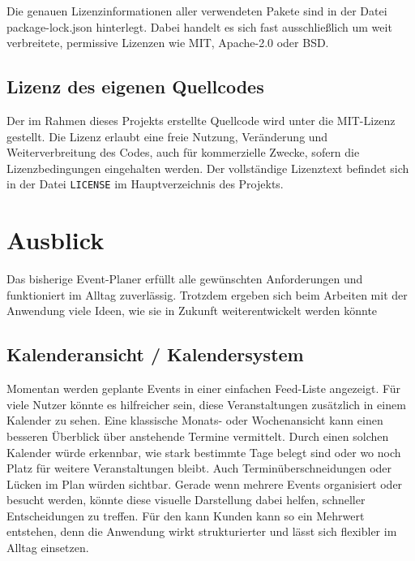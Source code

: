 \documentclass[a4paper,12pt]{article}
\begin{document}
Die genauen Lizenzinformationen aller verwendeten Pakete sind in der Datei package-lock.json hinterlegt. Dabei handelt es sich fast ausschließlich um weit verbreitete, permissive Lizenzen wie MIT, Apache-2.0 oder BSD.

\subsection{Lizenz des eigenen Quellcodes}

Der im Rahmen dieses Projekts erstellte Quellcode wird unter die MIT-Lizenz gestellt. Die Lizenz erlaubt eine freie Nutzung, Veränderung und Weiterverbreitung des Codes, auch für kommerzielle Zwecke, sofern die Lizenzbedingungen eingehalten werden. Der vollständige Lizenztext befindet sich in der Datei \texttt{LICENSE} im Hauptverzeichnis des Projekts.


\newpage


\section{Ausblick}

Das bisherige Event-Planer erfüllt alle gewünschten Anforderungen und funktioniert im Alltag zuverlässig. Trotzdem ergeben sich beim Arbeiten mit der Anwendung viele Ideen, wie sie in Zukunft weiterentwickelt werden könnte


\subsection{Kalenderansicht / Kalendersystem}

Momentan werden geplante Events in einer einfachen Feed-Liste angezeigt. Für viele Nutzer könnte es hilfreicher sein, diese Veranstaltungen zusätzlich in einem Kalender zu sehen. Eine klassische Monats- oder Wochenansicht kann einen besseren Überblick über anstehende Termine vermittelt. Durch einen solchen Kalender würde erkennbar, wie stark bestimmte Tage belegt sind oder wo noch Platz für weitere Veranstaltungen bleibt. Auch Terminüberschneidungen oder Lücken im Plan würden sichtbar. Gerade wenn mehrere Events organisiert oder besucht werden, könnte diese visuelle Darstellung dabei helfen, schneller Entscheidungen zu treffen. Für den kann Kunden kann so ein Mehrwert entstehen, denn die Anwendung wirkt strukturierter und lässt sich flexibler im Alltag einsetzen.
\end{document}

